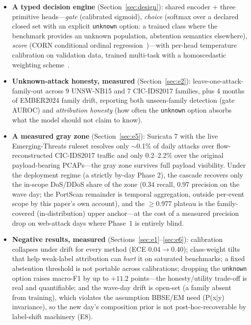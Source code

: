 \documentclass[sigconf,anonymous=false]{acmart}
\begin{document}
\begin{itemize}
\item \textbf{A typed decision engine} (Section~\ref{sec:design}): shared encoder + three primitive heads---\emph{gate} (calibrated sigmoid), \emph{choice} (softmax over a declared closed set with an explicit \texttt{unknown} option: a trained class where the benchmark provides an unknown population, abstention semantics elsewhere), \emph{score} (CORN conditional ordinal regression~\cite{shi2023corn})---with per-head temperature calibration on validation data, trained multi-task with a homoscedastic weighting scheme~\cite{kendall2018multitask}.
\item \textbf{Unknown-attack honesty, measured} (Section~\ref{sec:e2}): leave-one-attack-family-out across 9 UNSW-NB15 and 7 CIC-IDS2017 families, plus 4 months of EMBER2024 family drift, reporting both unseen-family detection (gate AUROC) and \emph{attribution honesty} (how often the \texttt{unknown} option absorbs what the model should not claim to know).
\item \textbf{A measured gray zone} (Section~\ref{sec:e5}): Suricata 7 with the live Emerging-Threats ruleset resolves only $\sim$0.1\% of daily attacks over flow-reconstructed CIC-IDS2017 traffic and only 0.2--2.2\% over the original payload-bearing PCAPs---the gray zone survives full payload visibility. Under the deployment regime (a strictly by-day Phase 2), the cascade recovers only the in-scope DoS/DDoS share of the zone (0.34 recall, 0.97 precision on the wave day; the PortScan remainder is temporal aggregation, outside per-event scope by this paper's own account), and the $\ge$0.977 plateau is the family-covered (in-distribution) upper anchor---at the cost of a measured precision drop on web-attack days where Phase~1 is entirely blind.
\item \textbf{Negative results, measured} (Sections~\ref{sec:e1}--\ref{sec:e6}): calibration collapses under drift for every method (ECE 0.04$\to$0.40); class-weight tilts that help weak-label attribution can \emph{hurt} it on saturated benchmarks; a fixed abstention threshold is not portable across calibrations; dropping the \texttt{unknown} option raises macro-F1 by up to $+11.2$ points---the honesty/utility trade-off is real and quantifiable; and the wave-day drift is open-set (a family absent from training), which violates the assumption BBSE/EM need (P(x|y) invariance), so the new day's composition prior is not post-hoc-recoverable by label-shift machinery (E8).
\end{itemize}
\end{document}
